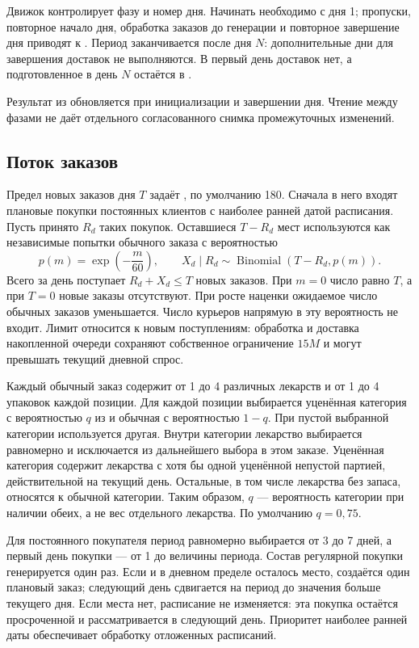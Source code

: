 Движок контролирует фазу и номер дня. Начинать необходимо с дня 1;
пропуски, повторное начало дня, обработка заказов до генерации и повторное
завершение дня приводят к .
Период заканчивается после дня $N$: дополнительные дни для завершения
доставок не выполняются. В первый день доставок нет, а подготовленное в день
$N$ остаётся в .

Результат из  обновляется при инициализации и
завершении дня. Чтение между фазами не даёт отдельного согласованного снимка
промежуточных изменений.

\subsection{Поток заказов}
Предел новых заказов дня $T$ задаёт , по умолчанию 180.
Сначала в него входят плановые покупки постоянных клиентов с наиболее ранней
датой расписания. Пусть принято $R_d$ таких покупок. Оставшиеся $T-R_d$ мест
используются как независимые попытки обычного заказа с вероятностью
\begin{equation}
  p(m)=\exp\left(-\frac{m}{60}\right), \qquad
  X_d\mid R_d\sim\operatorname{Binomial}(T-R_d,p(m)).
\end{equation}
Всего за день поступает $R_d+X_d\leq T$ новых заказов. При $m=0$ число равно
$T$, а при $T=0$ новые заказы отсутствуют. При росте наценки ожидаемое число
обычных заказов уменьшается. Число курьеров напрямую в эту вероятность не входит.
Лимит относится к новым поступлениям: обработка и доставка накопленной очереди
сохраняют собственное ограничение $15M$ и могут превышать текущий дневной спрос.

Каждый обычный заказ содержит от 1 до 4 различных лекарств и от 1 до 4
упаковок каждой позиции. Для каждой позиции выбирается уценённая категория
с вероятностью $q$ из  и обычная с вероятностью $1-q$.
При пустой выбранной категории используется другая. Внутри категории лекарство
выбирается равномерно и исключается из дальнейшего выбора в этом заказе.
Уценённая категория содержит лекарства с хотя бы одной уценённой непустой
партией, действительной на текущий день. Остальные, в том числе лекарства
без запаса, относятся к обычной категории. Таким образом, $q$ --- вероятность
категории при наличии обеих, а не вес отдельного лекарства. По умолчанию $q=0{,}75$.

Для постоянного покупателя период равномерно выбирается от 3 до 7 дней,
а первый день покупки --- от 1 до величины периода. Состав регулярной покупки
генерируется один раз. Если  и в дневном пределе
осталось место, создаётся один плановый заказ; следующий день сдвигается на
период до значения больше текущего дня. Если места нет, расписание не изменяется:
эта покупка остаётся просроченной и рассматривается в следующий день.
Приоритет наиболее ранней даты обеспечивает обработку отложенных расписаний.

